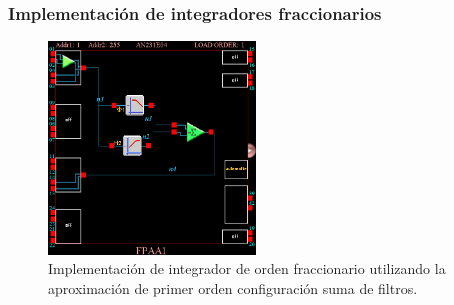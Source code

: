 \documentclass[10pt]{beamer}
\begin{document}
	\begin{frame}
		\frametitle{Implementación de integradores fraccionarios}
		\begin{figure}[!ht] 
		\caption{Implementación de integrador de orden fraccionario utilizando la aproximación de primer orden configuración suma de filtros.}
		\label{fig:V16_AD2_imple_suma_filtros}
		\centering
		\includegraphics[width = 5.5cm]{../imagenes/V16_AD2_imple_suma_filtros.png}
	\end{figure}
	\end{frame}
\end{document}
